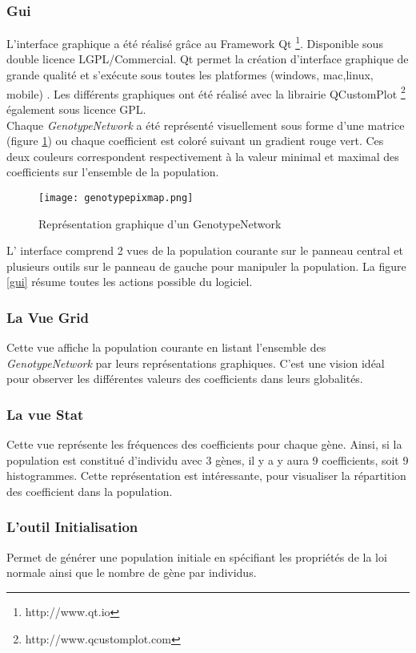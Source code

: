 \documentclass{article}
\begin{document}
	\subsubsection {Gui}
	L'interface graphique a été réalisé grâce au Framework Qt \footnote{http://www.qt.io}. Disponible sous double licence LGPL/Commercial. Qt permet la création d'interface graphique de grande qualité et s’exécute sous toutes les platformes (windows, mac,linux, mobile) . Les différents graphiques ont été réalisé avec la librairie QCustomPlot \footnote{http://www.qcustomplot.com} également sous licence GPL. \\
	Chaque \emph{GenotypeNetwork} a été représenté visuellement sous forme d'une matrice (figure \ref{figure2}) ou chaque coefficient est coloré suivant un gradient rouge vert. Ces deux couleurs correspondent respectivement à la valeur minimal et maximal des coefficients sur l'ensemble de la population.

	\begin{figure}[h]
	\caption[test]{Représentation graphique d'un GenotypeNetwork }
	\centering
	\texttt{[image: genotypepixmap.png]}
	\label{figure2}
	\end{figure}


	\clearpage
	L' interface comprend 2 vues de la population courante sur le panneau central et plusieurs outils sur le panneau de gauche pour manipuler la population. La figure \ref{gui} résume toutes les actions possible du logiciel.
	\subsubsection {La Vue Grid}
	Cette vue affiche la population courante en listant l'ensemble des \emph{GenotypeNetwork} par leurs représentations graphiques. C'est une vision idéal pour observer les différentes valeurs des coefficients dans leurs globalités. 
	\subsubsection { La vue Stat}
	Cette vue représente les fréquences des coefficients pour chaque gène. Ainsi, si la population est constitué d’individu avec 3 gènes, il y a y aura 9 coefficients, soit 9 histogrammes. Cette représentation est intéressante, pour visualiser la répartition des coefficient dans la population.
	\subsubsection {L'outil Initialisation}
	Permet de générer une population initiale en spécifiant les propriétés de la loi normale ainsi que le nombre de gène par individus.
\end{document}
